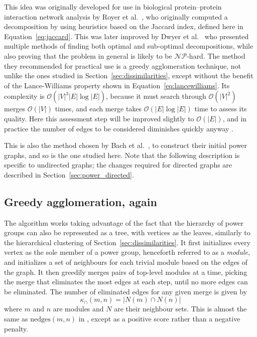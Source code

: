 This idea was originally developed for use in biological protein--protein interaction network analysis by Royer et al.\ \cite{Royer2008}, who originally computed a decomposition by using heuristics based on the Jaccard index, defined here in Equation~\ref{eq:jaccard}. This was later improved by Dwyer et al.\ \cite{Dwyer2014} who presented multiple methods of finding both optimal and sub-optimal decompositions, while also proving that the problem in general is likely to be $\mathcal{NP}$-hard. The method they recommended for practical use is a greedy agglomeration technique, not unlike the ones studied in Section~\ref{sec:dissimilarities}, except without the benefit of the Lance-Williams property shown in Equation~\eqref{eq:lancewilliams}. Its complexity is $\mathcal{O}(|V|^3|E|\log|E|)$, because it must search through $\mathcal{O}(|V|^2)$ merges $\mathcal{O}(|V|)$ times, and each merge takes $\mathcal{O}(|E|\log|E|)$ time to assess its quality. Here this assessment step will be improved slightly to $\mathcal{O}(|E|)$, and in practice the number of edges to be considered diminishes quickly anyway \cite{Dwyer2014}.

This is also the method chosen by Bach et al.\ \cite{Bach2017}, to construct their initial power graphs, and so is the one studied here. Note that the following description is specific to undirected graphs; the changes required for directed graphs are described in Section~\ref{sec:power_directed}.

\subsection{Greedy agglomeration, again}
The algorithm works taking advantage of the fact that the hierarchy of power groups can also be represented as a tree, with vertices as the leaves, similarly to the hierarchical clustering of Section~\ref{sec:dissimilarities}. It first initializes every vertex as the sole member of a power group, henceforth referred to as a \emph{module}, and initializes a set of neighbours for each trivial module based on the edges of the graph.
It then greedily merges pairs of top-level modules at a time, picking the merge that eliminates the most edges at each step, until no more edges can be eliminated.
The number of eliminated edges for any given merge is given by
\begin{equation}
  \kappa_{\cap}(m, n) = |N(m)\cap N(n)|
  \label{eq:kappa_cap}
\end{equation}
where $m$ and $n$ are modules and $N$ are their neighbour sets.
This is almost the same as $\mathrm{nedges}(m,n)$ in \cite{Dwyer2014}, except as a positive score rather than a negative penalty.

